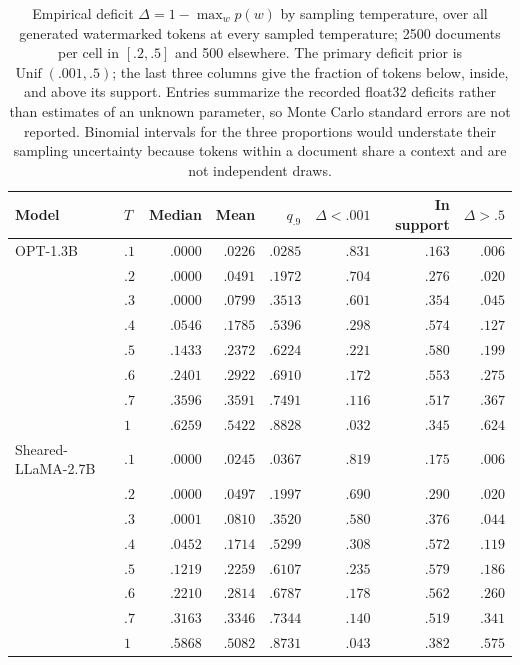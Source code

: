 \documentclass[11pt]{article}
\newcommand{\Unif}{\operatorname{Unif}}
\begin{document}
\begin{table}[t]
\centering
\small
\caption{Empirical deficit $\Delta=1-\max_w p(w)$ by sampling temperature, over all generated watermarked tokens at every sampled temperature; 2500 documents per cell in $[.2,.5]$ and 500 elsewhere.  The primary deficit prior is $\Unif(.001,.5)$; the last three columns give the fraction of tokens below, inside, and above its support.  Entries summarize the recorded float32 deficits rather than estimates of an unknown parameter, so Monte Carlo standard errors are not reported.  Binomial intervals for the three proportions would understate their sampling uncertainty because tokens within a document share a context and are not independent draws.}
\label{tab:deficit-regime}
\begin{tabular}{llrrrrrr}
\toprule
Model & $T$ & Median & Mean & $q_{.9}$ & $\Delta<.001$ & In support & $\Delta>.5$ \\
\midrule
OPT-1.3B & $.1$ & $.0000$ & $.0226$ & $.0285$ & $.831$ & $.163$ & $.006$ \\
 & $.2$ & $.0000$ & $.0491$ & $.1972$ & $.704$ & $.276$ & $.020$ \\
 & $.3$ & $.0000$ & $.0799$ & $.3513$ & $.601$ & $.354$ & $.045$ \\
 & $.4$ & $.0546$ & $.1785$ & $.5396$ & $.298$ & $.574$ & $.127$ \\
 & $.5$ & $.1433$ & $.2372$ & $.6224$ & $.221$ & $.580$ & $.199$ \\
 & $.6$ & $.2401$ & $.2922$ & $.6910$ & $.172$ & $.553$ & $.275$ \\
 & $.7$ & $.3596$ & $.3591$ & $.7491$ & $.116$ & $.517$ & $.367$ \\
 & $1$ & $.6259$ & $.5422$ & $.8828$ & $.032$ & $.345$ & $.624$ \\
\addlinespace
Sheared-LLaMA-2.7B & $.1$ & $.0000$ & $.0245$ & $.0367$ & $.819$ & $.175$ & $.006$ \\
 & $.2$ & $.0000$ & $.0497$ & $.1997$ & $.690$ & $.290$ & $.020$ \\
 & $.3$ & $.0001$ & $.0810$ & $.3520$ & $.580$ & $.376$ & $.044$ \\
 & $.4$ & $.0452$ & $.1714$ & $.5299$ & $.308$ & $.572$ & $.119$ \\
 & $.5$ & $.1219$ & $.2259$ & $.6107$ & $.235$ & $.579$ & $.186$ \\
 & $.6$ & $.2210$ & $.2814$ & $.6787$ & $.178$ & $.562$ & $.260$ \\
 & $.7$ & $.3163$ & $.3346$ & $.7344$ & $.140$ & $.519$ & $.341$ \\
 & $1$ & $.5868$ & $.5082$ & $.8731$ & $.043$ & $.382$ & $.575$ \\
\bottomrule
\end{tabular}
\end{table}
\end{document}
